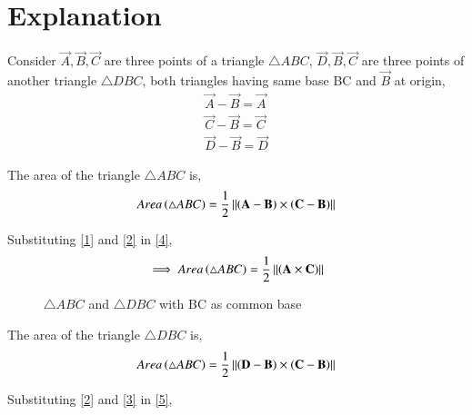 \documentclass[journal,12pt,twocolumn]{IEEEtran}
\begin{document}
\section{Explanation}
\item Consider $\vec{A},\vec{B},\vec{C}$ are three points of a triangle $\triangle ABC$, $\vec{D}, \vec{B}, \vec{C}$ are three points of another triangle $\triangle DBC$, both triangles having same base BC and $\vec{B}$ at origin, 
\begin{align}
    \label{1}
    \vec{A}-\vec{B}=\vec{A}\\
    \label{2}
    \vec{C}-\vec{B}=\vec{C}\\
    \label{3}
    \vec{D}-\vec{B}=\vec{D}
\end{align}
\item The area of the triangle $\triangle ABC$ is,
\begin{align}
    \label{4}
    Area\left(\triangle ABC\right) = \frac{1}{2}\left\lVert\left(\mathbf{A} - \mathbf{B}\right) \times \left(\mathbf{C} - \mathbf{B}\right)\right\rVert
\end{align}
\item Substituting \eqref{1} and \eqref{2} in \eqref{4}, 
\begin{align}
    \label{ABC}
    \implies Area\left(\triangle ABC\right) = \frac{1}{2}\left\lVert\left(\mathbf{A} \times \mathbf{C}\right)\right\rVert
\end{align}
\begin{figure}[!ht] \label{fig:triangle_abc}
\centering
{}
\caption{$\triangle ABC$ and $\triangle DBC$ with BC as common base}
\label{fig:solutions/1/2/two}
\end{figure}
\item The area of the triangle $\triangle DBC$ is,
\begin{align}
    \label{5}
    Area\left(\triangle ABC\right) = \frac{1}{2}\left\lVert\left(\mathbf{D} - \mathbf{B}\right) \times \left(\mathbf{C} - \mathbf{B}\right)\right\rVert
\end{align}   
\item Substituting \eqref{2} and \eqref{3} in \eqref{5}, 
\end{document}
